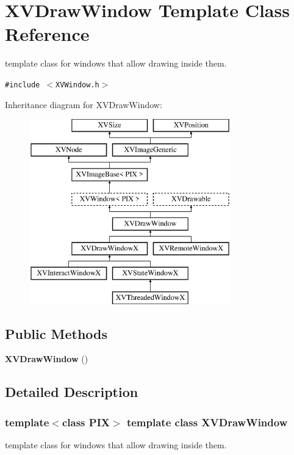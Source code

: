 \hypertarget{class_XVDrawWindow}{
\section{XVDraw\-Window  Template Class Reference}
\label{XVDrawWindow}
}
template class for windows that allow drawing inside them. 


{\tt \#include $<$XVWindow.h$>$}

Inheritance diagram for XVDraw\-Window:\begin{figure}[H]
\begin{center}
\leavevmode
\includegraphics[height=8cm]{class_XVDrawWindow}
\end{center}
\end{figure}
\subsection*{Public Methods}
\begin{CompactItemize}
\item 
{\bf XVDraw\-Window} ()
\end{CompactItemize}


\subsection{Detailed Description}
\subsubsection*{template$<$class PIX$>$  template class XVDraw\-Window}

template class for windows that allow drawing inside them.





